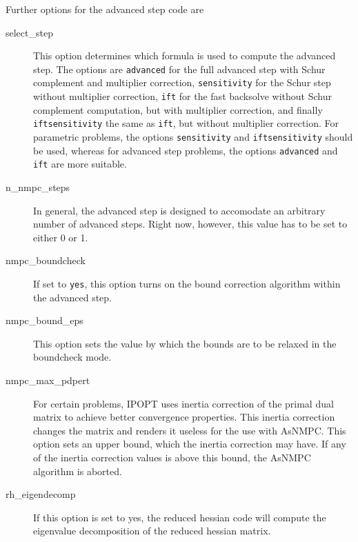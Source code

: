 \documentclass[a4paper]{article}
\begin{document}
Further options for the advanced step code are
\begin{description}
\item[select\_step] This option determines which formula is used to compute the advanced step. The options are \texttt{advanced} for the full advanced step with Schur complement and multiplier correction, \texttt{sensitivity} for the Schur step without multiplier correction, \texttt{ift} for the fast backsolve without Schur complement computation, but with multiplier correction, and finally \texttt{iftsensitivity} the same as \texttt{ift}, but without multiplier correction. For parametric problems, the options \texttt{sensitivity} and \texttt{iftsensitivity} should be used, whereas for advanced step problems, the options \texttt{advanced} and \texttt{ift} are more suitable.
\item[n\_nmpc\_steps] In general, the advanced step is designed to accomodate an arbitrary number of advanced steps. Right now, however, this value has to be set to either 0 or 1.
\item[nmpc\_boundcheck] If set to \texttt{yes}, this option turns on the bound correction algorithm within the advanced step. 
\item[nmpc\_bound\_eps] This option sets the value by which the bounds are to be relaxed in the boundcheck mode. 
\item[nmpc\_max\_pdpert] For certain problems, IPOPT uses inertia correction of the primal dual matrix to achieve better convergence properties. This inertia correction changes the matrix and renders it useless for the use with AsNMPC. This option sets an upper bound, which the inertia correction may have. If any of the inertia correction values is above this bound, the AsNMPC algorithm is aborted.
\item[rh\_eigendecomp] If this option is set to yes, the reduced hessian code will compute the eigenvalue decomposition of the reduced hessian matrix. 
\end{description}


\end{document}
